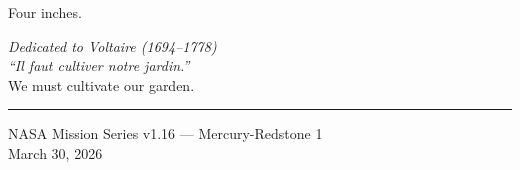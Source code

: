 \documentclass[12pt, letterpaper]{article}
\begin{document}
Four inches.

\vspace{2em}
\begin{center}
\textit{Dedicated to Voltaire (1694--1778)}\\[0.5em]
\textit{``Il faut cultiver notre jardin.''}\\
We must cultivate our garden.
\end{center}

\vspace{1em}
\noindent\rule{\textwidth}{0.4pt}
\begin{center}
\small NASA Mission Series v1.16 --- Mercury-Redstone 1\\
\small March 30, 2026
\end{center}
\end{document}

